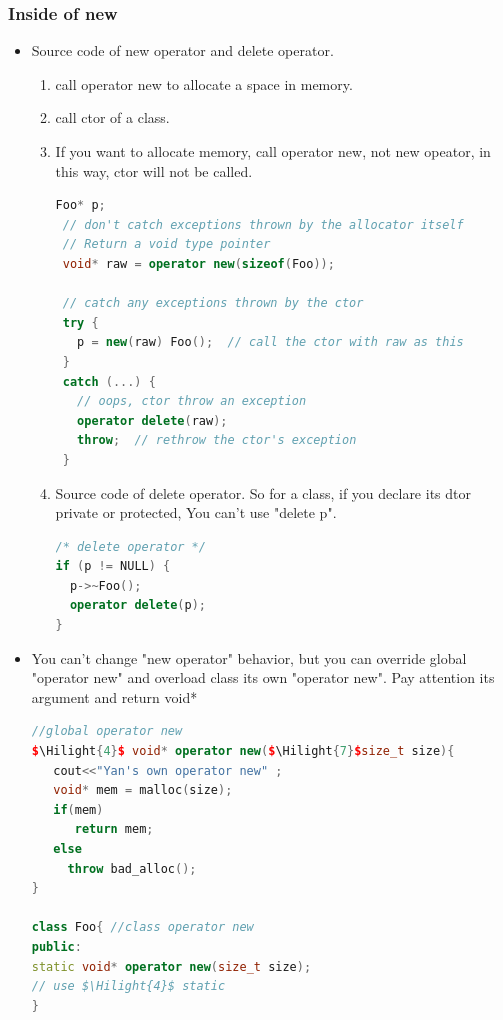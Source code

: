 \documentclass[a4paper,12pt,twoside]{book}
\newcommand{\Hilight}[1]{\makebox[0pt][l]{\color{yellow}\rule[-3pt]{#1em}{11pt}}}
\begin{document}
\subsubsection{Inside of new}
\begin{itemize}
\item Source code of new operator and delete operator.

\begin{enumerate}
\item call operator new to allocate a space in memory.
\item call ctor of a class.
\item If you want to allocate memory, call operator new, not new opeator, in this way, ctor will not be called.

\begin{lstlisting}[frame=single, language=c++]
Foo* p;
 // don't catch exceptions thrown by the allocator itself
 // Return a void type pointer
 void* raw = operator new(sizeof(Foo));

 // catch any exceptions thrown by the ctor
 try {
   p = new(raw) Foo();  // call the ctor with raw as this
 }
 catch (...) {
   // oops, ctor throw an exception
   operator delete(raw);
   throw;  // rethrow the ctor's exception
 }
\end{lstlisting}

\item Source code of delete operator. So for a class, if you declare its dtor private or protected, You can't use "delete p".
\begin{lstlisting}[frame=single, language=c++]
/* delete operator */
if (p != NULL) {
  p->~Foo();
  operator delete(p);
}
\end{lstlisting}
\end{enumerate}

\item You can't change "new operator" behavior, but you can override global "operator new" and overload class its own "operator new". Pay attention its argument and return void*

\begin{lstlisting}[frame=single, language=c++, mathescape=true]
//global operator new
$\Hilight{4}$ void* operator new($\Hilight{7}$size_t size){
   cout<<"Yan's own operator new" ;
   void* mem = malloc(size);
   if(mem)
      return mem;
   else
     throw bad_alloc();
}

class Foo{ //class operator new
public:
static void* operator new(size_t size);
// use $\Hilight{4}$ static
}


\end{lstlisting}
\end{itemize}
\end{document}
